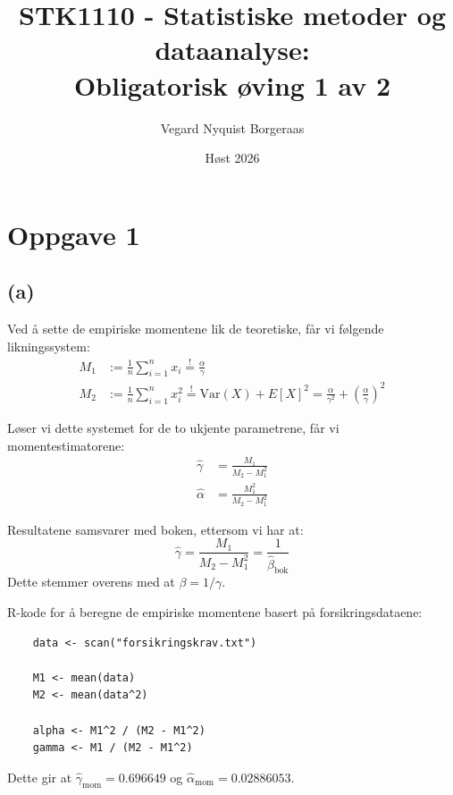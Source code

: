 \documentclass[11pt, a4paper]{article}
\title{STK1110 - Statistiske metoder og dataanalyse: \\ Obligatorisk øving 1 av 2}
\author{Vegard Nyquist Borgeraas}
\date{Høst 2026}
\begin{document}
\maketitle

\vspace{1cm}

\section*{Oppgave 1}

\subsection*{(a)}
Ved å sette de empiriske momentene lik de teoretiske, får vi følgende likningssystem:
\begin{align*}
    M_1 &:= \frac{1}{n} \sum_{i=1}^{n} x_i \overset{!}{=} \frac{\alpha}{\gamma} \\[1ex]
    M_2 &:=\frac{1}{n} \sum_{i=1}^{n} x_i^2 \overset{!}{=} \text{Var}(X) + E[X]^2 = \frac{\alpha}{\gamma^2} + \left(\frac{\alpha}{\gamma}\right)^2
\end{align*}

Løser vi dette systemet for de to ukjente parametrene, får vi momentestimatorene:
\begin{align*}
    \hat{\gamma} &= \frac{M_1}{M_2 - M_1^2} \\
    \hat{\alpha} &= \frac{M_1^2}{M_2 - M_1^2}
\end{align*}

Resultatene samsvarer med boken, ettersom vi har at:
\begin{equation*}
    \hat{\gamma} = \frac{M_1}{M_2 - M_1^2} =  \frac{1}{\hat{\beta}_{\text{bok}}}
\end{equation*}
Dette stemmer overens med at $\beta = 1/\gamma$.

R-kode for å beregne de empiriske momentene basert på forsikringsdataene:
\vspace{0.5cm}
\begin{verbatim}
    data <- scan("forsikringskrav.txt")

    M1 <- mean(data)
    M2 <- mean(data^2)

    alpha <- M1^2 / (M2 - M1^2)
    gamma <- M1 / (M2 - M1^2)
\end{verbatim}

Dette gir at $\hat{\gamma}_{\text{mom}} = 0.696649$ og  $\hat{\alpha}_{\text{mom}} = 0.02886053$.
\end{document}
